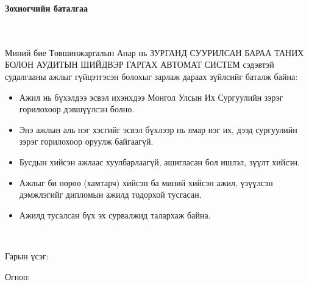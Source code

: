 \makefrontpage
\maketitle

\doublespace

\begin{huge}
\textbf{Зохиогчийн баталгаа}
\end{huge} \\ \ \\ 
\doublespace
Миний бие Төвшинжаргалын Анар нь ЗУРГАНД СУУРИЛСАН БАРАА ТАНИХ БОЛОН АУДИТЫН ШИЙДВЭР ГАРГАХ АВТОМАТ СИСТЕМ сэдэвтэй судалгааны ажлыг гүйцэтгэсэн болохыг зарлаж дараах зүйлсийг баталж байна:
\begin{itemize}
\item Ажил нь бүхэлдээ эсвэл ихэнхдээ Монгол Улсын Их Сургуулийн зэрэг горилохоор дэвшүүлсэн болно.
\item Энэ ажлын аль нэг хэсгийг эсвэл бүхлээр нь ямар нэг их, дээд сургуулийн зэрэг горилохоор оруулж байгаагүй.
\item Бусдын хийсэн ажлаас хуулбарлаагүй, ашигласан бол ишлэл, зүүлт хийсэн.
\item Ажлыг би өөрөө (хамтарч) хийсэн ба миний хийсэн ажил, үзүүлсэн дэмжлэгийг дипломын ажилд тодорхой тусгасан. 
\item Ажилд тусалсан бүх эх сурвалжид талархаж байна. 
\end{itemize} 
\ 

Гарын үсэг: \underline{\hspace{5cm}} 

Огноо: 	\ \ \underline{\hspace{3cm}}

\setcounter{tocdepth}{1}
\tableofcontents

\listoffigures

\listoftables

\lstlistoflistings

\newpage
\newpage

\renewcommand{\cftlabel}{Зураг}


\doublespace
{}
